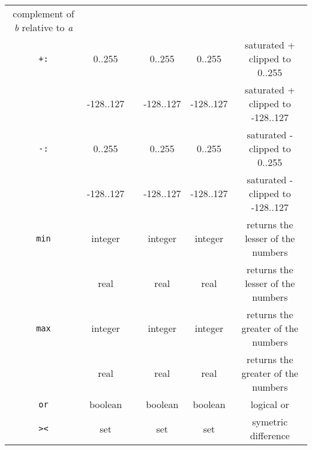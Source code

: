 {\begin{table}
{\begin{tabular}{cccccc}
{\footnotesize complement\index{complement} of} \emph{\footnotesize b} {\footnotesize relative
to} \emph{\footnotesize a}{\footnotesize }\\
\texttt{\footnotesize +:}{\footnotesize }&
{\footnotesize 0..255}&
{\footnotesize }&
{\footnotesize 0..255}&
{\footnotesize 0..255}&
{\footnotesize saturated + clipped to 0..255 }\\
{\footnotesize }&
{\footnotesize -128..127}&
{\footnotesize }&
{\footnotesize -128..127}&
{\footnotesize -128..127}&
{\footnotesize saturated + clipped to -128..127}\\
\texttt{\footnotesize -:}{\footnotesize }&
{\footnotesize 0..255}&
{\footnotesize }&
{\footnotesize 0..255}&
{\footnotesize 0..255}&
{\footnotesize saturated\index{saturated} - clipped to 0..255}\\
{\footnotesize }&
{\footnotesize -128..127}&
{\footnotesize }&
{\footnotesize -128..127}&
{\footnotesize -128..127}&
{\footnotesize saturated - clipped to -128..127}\\
\texttt{\footnotesize min\index{min}}{\footnotesize }&
{\footnotesize integer}&
{\footnotesize }&
{\footnotesize integer}&
{\footnotesize integer}&
{\footnotesize returns the lesser of the numbers}\\
&
{\footnotesize real}&
{\footnotesize }&
{\footnotesize real}&
{\footnotesize real}&
{\footnotesize returns the lesser of the numbers}\\
\texttt{\footnotesize max\index{max}}{\footnotesize }&
{\footnotesize integer}&
{\footnotesize }&
{\footnotesize integer}&
{\footnotesize integer}&
{\footnotesize returns the greater of the numbers}\\
&
{\footnotesize real}&
{\footnotesize }&
{\footnotesize real}&
{\footnotesize real}&
{\footnotesize returns the greater of the numbers}\\
\texttt{\footnotesize or}{\footnotesize }&
{\footnotesize boolean}&
{\footnotesize }&
{\footnotesize boolean}&
{\footnotesize boolean}&
{\footnotesize logical or}\\
{ \verb+><+}&
{\footnotesize set}&
{\footnotesize }&
{\footnotesize set}&
{\footnotesize set}&
{\footnotesize symetric difference}\\

\hline 
\end{tabular}\footnotesize \par}\end{table}


}
